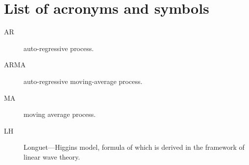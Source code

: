 \section{List of acronyms and symbols}
\begin{description}
    \item[{AR}] auto-regressive process.
    \item[{ARMA}] auto-regressive moving-average process.
    \item[{MA}] moving average process.
    \item[{LH}] Longuet---Higgins model, formula of which is derived in the framework of
    linear wave theory.
\end{description}    